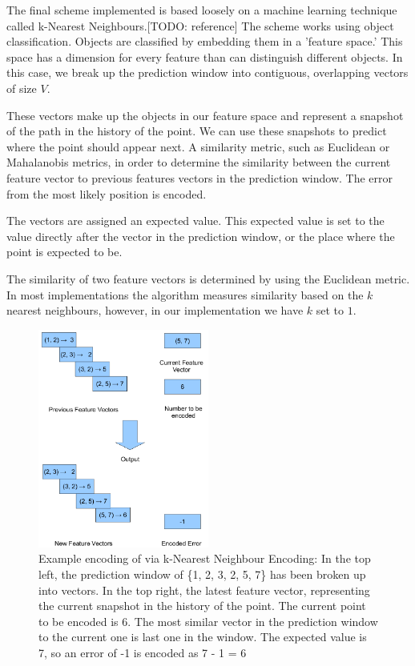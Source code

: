 \documentclass[a4paper,11pt]{report}
\begin{document}
The final scheme implemented is based loosely on a machine learning technique called k-Nearest Neighbours.[TODO: reference] The scheme works using object classification. Objects are classified by embedding them in a 'feature space.' This space has a dimension for every feature than can distinguish different objects. In this case, we break up the prediction window into contiguous, overlapping vectors of size $V$. 

These vectors make up the objects in our feature space and represent a snapshot of the path in the history of the point. We can use these snapshots to predict where the point should appear next. A similarity metric, such as Euclidean or Mahalanobis metrics, in order to determine the similarity between the current feature vector to previous features vectors in the prediction window. The error from the most likely position is encoded.

The vectors are assigned an expected value. This expected value is set to the value directly after the vector in the prediction window, or the place where the point is expected to be.

The similarity of two feature vectors is determined by using the Euclidean metric. In most implementations the algorithm measures similarity based on the $k$ nearest neighbours, however, in our implementation we have $k$ set to $1$.

\begin{figure}
 \center
 \includegraphics[width=0.5\textwidth]{resources/NN.png}
\caption{Example encoding of via k-Nearest Neighbour Encoding: In the top left, the prediction window of \{1, 2, 3, 2, 5, 7\} has been broken up into vectors. In the top right, the latest feature vector, representing the current snapshot in the history of the point. The current point to be encoded is 6. The most similar vector in the prediction window to the current one is last one in the window. The expected value is 7, so an error of -1 is encoded as 7 - 1 = 6}
\label{kNNDescrip}
\end{figure}
\end{document}

